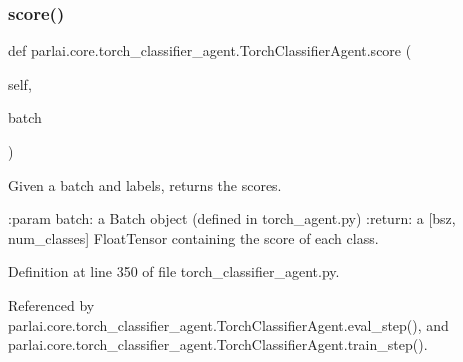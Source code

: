 \mbox{\label{classparlai_1_1core_1_1torch__classifier__agent_1_1TorchClassifierAgent_a04e97e79ef7e497c0927c10b31e42337}} 
\subsubsection{\texorpdfstring{score()}{score()}}
{\footnotesize\ttfamily def parlai.\+core.\+torch\+\_\+classifier\+\_\+agent.\+Torch\+Classifier\+Agent.\+score (\begin{DoxyParamCaption}\item[{}]{self,  }\item[{}]{batch }\end{DoxyParamCaption})}

\begin{DoxyVerb}Given a batch and labels, returns the scores.

:param batch:
    a Batch object (defined in torch_agent.py)
:return:
    a [bsz, num_classes] FloatTensor containing the score of each
    class.
\end{DoxyVerb}
 

Definition at line 350 of file torch\+\_\+classifier\+\_\+agent.\+py.



Referenced by parlai.\+core.\+torch\+\_\+classifier\+\_\+agent.\+Torch\+Classifier\+Agent.\+eval\+\_\+step(), and parlai.\+core.\+torch\+\_\+classifier\+\_\+agent.\+Torch\+Classifier\+Agent.\+train\+\_\+step().

